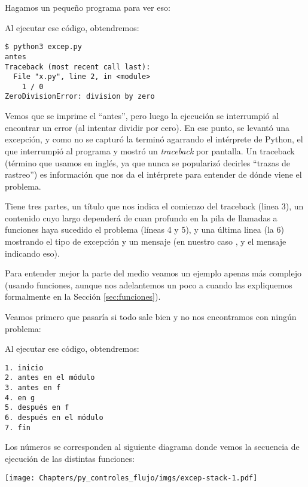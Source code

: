 Hagamos un pequeño programa para ver eso:


Al ejecutar ese código, obtendremos:

\begin{verbatim}
$ python3 excep.py 
antes
Traceback (most recent call last):
  File "x.py", line 2, in <module>
    1 / 0
ZeroDivisionError: division by zero
\end{verbatim}

Vemos que se imprime el ``antes'', pero luego la ejecución se interrumpió al encontrar un error (al intentar dividir por cero). En ese punto, se levantó una excepción, y como no se capturó la terminó agarrando el intérprete de Python, el que interrumpió al programa y mostró un \textit{traceback} por pantalla. Un traceback (término que usamos en inglés, ya que nunca se popularizó decirles ``trazas de rastreo'') es información que nos da el intérprete para entender de dónde viene el problema.

Tiene tres partes, un título que nos indica el comienzo del traceback (linea 3), un contenido cuyo largo dependerá de cuan profundo en la pila de llamadas a funciones haya sucedido el problema (líneas 4 y 5), y una última linea (la 6) mostrando el tipo de excepción y un mensaje (en nuestro caso , y el mensaje indicando eso).

Para entender mejor la parte del medio veamos un ejemplo apenas más complejo (usando funciones, aunque nos adelantemos un poco a cuando las expliquemos formalmente en la Sección \ref{sec:funciones}).

Veamos primero que pasaría si todo sale bien y no nos encontramos con ningún problema:


Al ejecutar ese código, obtendremos:

\begin{verbatim}
1. inicio
2. antes en el módulo
3. antes en f
4. en g
5. después en f
6. después en el módulo
7. fin
\end{verbatim}  

Los números se corresponden al siguiente diagrama donde vemos la secuencia de ejecución de las distintas funciones:

\begin{center}
    \texttt{[image: Chapters/py\_controles\_flujo/imgs/excep-stack-1.pdf]}
\end{center}

